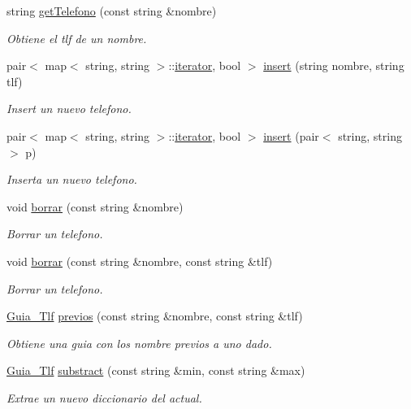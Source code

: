 \begin{DoxyCompactItemize}
string \hyperlink{classGuia__Tlf_a7aa76da3fe2032c7b1afd0b40c0a5a86}{get\+Telefono} (const string \&nombre)
\begin{DoxyCompactList}\small\item\em Obtiene el tlf de un nombre. \end{DoxyCompactList}\item 
pair$<$ map$<$ string, string $>$\+::\hyperlink{classGuia__Tlf_1_1iterator}{iterator}, bool $>$ \hyperlink{classGuia__Tlf_a8e712d6b87456d4cdb3c0c65adfb0262}{insert} (string nombre, string tlf)
\begin{DoxyCompactList}\small\item\em Insert un nuevo telefono. \end{DoxyCompactList}\item 
pair$<$ map$<$ string, string $>$\+::\hyperlink{classGuia__Tlf_1_1iterator}{iterator}, bool $>$ \hyperlink{classGuia__Tlf_a773d474972ea06ed8cf1bd031536bf82}{insert} (pair$<$ string, string $>$ p)
\begin{DoxyCompactList}\small\item\em Inserta un nuevo telefono. \end{DoxyCompactList}\item 
void \hyperlink{classGuia__Tlf_a57e32bbc9e76567d22e5275d4d2a6515}{borrar} (const string \&nombre)
\begin{DoxyCompactList}\small\item\em Borrar un telefono. \end{DoxyCompactList}\item 
void \hyperlink{classGuia__Tlf_af8adac24fd35985b9016a4a38cca60f4}{borrar} (const string \&nombre, const string \&tlf)
\begin{DoxyCompactList}\small\item\em Borrar un telefono. \end{DoxyCompactList}\item 
\hyperlink{classGuia__Tlf}{Guia\+\_\+\+Tlf} \hyperlink{classGuia__Tlf_a0a8ed6b386e90a6799a8693653b3e187}{previos} (const string \&nombre, const string \&tlf)
\begin{DoxyCompactList}\small\item\em Obtiene una guia con los nombre previos a uno dado. \end{DoxyCompactList}\item 
\hyperlink{classGuia__Tlf}{Guia\+\_\+\+Tlf} \hyperlink{classGuia__Tlf_a8018f3010c44546074b30966fbb43767}{substract} (const string \&min, const string \&max)
\begin{DoxyCompactList}\small\item\em Extrae un nuevo diccionario del actual. \end{DoxyCompactList}\item 

\end{DoxyCompactItemize}
